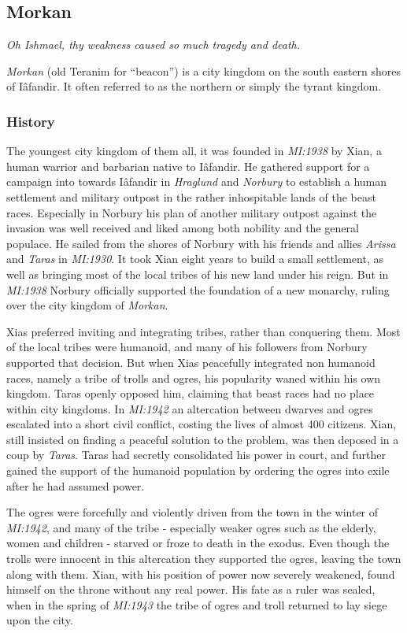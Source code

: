 \subsection*{Morkan}

\emph{Oh Ishmael, thy weakness caused so much tragedy and death.}

\emph{Morkan} (old Teranim for ``beacon'') is a city kingdom on the south
eastern shores of Iâfandir. It often referred to as the northern or simply
the tyrant kingdom.

\subsubsection*{History}

The youngest city kingdom of them all, it was founded in \emph{MI:1938} by
Xian, a human warrior and barbarian native to Iâfandir. He gathered support
for a campaign into towards Iâfandir in \emph{Hraglund} and \emph{Norbury} to
establish a human settlement and military outpost in the rather inhospitable
lands of the beast races. Especially in Norbury his plan of another military
outpost against the invasion was well received and liked among both nobility
and the general populace. He sailed from the shores of Norbury with his friends
and allies \emph{Arissa} and \emph{Taras} in \emph{MI:1930}. It took Xian
eight years to build a small settlement, as well as bringing most of the local
tribes of his new land under his reign. But in \emph{MI:1938} Norbury
officially supported the foundation of a new monarchy, ruling over the city
kingdom of \emph{Morkan}.

Xias preferred inviting and integrating tribes, rather than conquering them.
Most of the local tribes were humanoid, and many of his followers from Norbury
supported that decision. But when Xias peacefully integrated non humanoid races,
namely a tribe of trolls and ogres, his popularity waned within his own kingdom.
Taras openly opposed him, claiming that beast races had no place within city
kingdoms. In \emph{MI:1942} an altercation between dwarves and ogres escalated
into a short civil conflict, costing the lives of almost 400 citizens. Xian,
still insisted on finding a peaceful solution to the problem, was then deposed
in a coup by \emph{Taras}. Taras had secretly consolidated his power in court,
and further gained the support of the humanoid population by ordering the ogres
into exile after he had assumed power.

The ogres were forcefully and violently driven from the town in the winter of
\emph{MI:1942}, and many of the tribe - especially weaker ogres such as the
elderly, women and children - starved or froze to death in the exodus. Even
though the trolls were innocent in this altercation they supported the ogres,
leaving the town along with them. Xian, with his position of power now
severely weakened, found himself on the throne without any real power. His
fate as a ruler was sealed, when in the spring of \emph{MI:1943} the tribe of
ogres and troll returned to lay siege upon the city. 

